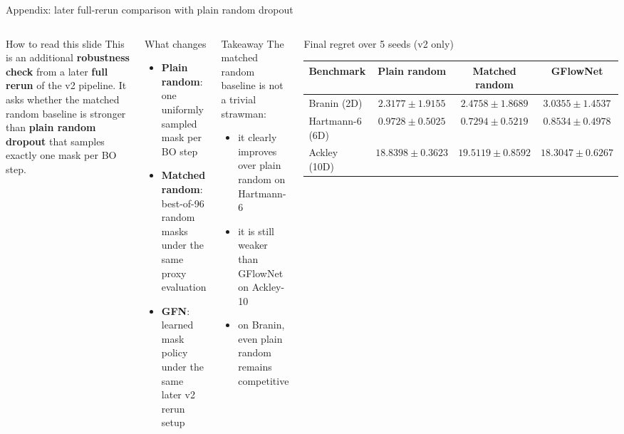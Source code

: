 \documentclass[aspectratio=169]{beamer}
\begin{document}
\appendix
\begin{frame}{Appendix: later full-rerun comparison with plain random dropout}
\vspace{-0.55em}
\begin{columns}[T,onlytextwidth]
\begin{minipage}[t][0.80\textheight]{\linewidth}\vspace{0pt}
  \begin{cardW}{How to read this slide}
  This is an additional \textbf{robustness check} from a later \textbf{full rerun} of the v2 pipeline. It asks whether the matched random baseline is stronger than \textbf{plain random dropout} that samples exactly one mask per BO step.
  \end{cardW}

  \vfill

  \begin{cardA}{What changes}
  \begin{itemize}
    \item \textbf{Plain random}: one uniformly sampled mask per BO step
    \item \textbf{Matched random}: best-of-96 random masks under the same proxy evaluation
    \item \textbf{GFN}: learned mask policy under the same later v2 rerun setup
  \end{itemize}
  \end{cardA}

  \vfill

  \begin{cardG}{Takeaway}
  The matched random baseline is not a trivial strawman:
  \begin{itemize}
    \item it clearly improves over plain random on Hartmann-6
    \item it is still weaker than GFlowNet on Ackley-10
    \item on Branin, even plain random remains competitive
  \end{itemize}
  \end{cardG}
\end{minipage}

\begin{minipage}[t][0.80\textheight]{\linewidth}\vspace{0pt}
  \begin{card}{Final regret over 5 seeds (v2 only)}
  \centering
  \scriptsize
  \begin{tabular}{lccc}
  \toprule
  Benchmark & Plain random & Matched random & GFlowNet \\
  \midrule
  Branin (2D) & $2.3177 \pm 1.9155$ & $2.4758 \pm 1.8689$ & $3.0355 \pm 1.4537$ \\
  Hartmann-6 (6D) & $0.9728 \pm 0.5025$ & $0.7294 \pm 0.5219$ & $0.8534 \pm 0.4978$ \\
  Ackley (10D) & $18.8398 \pm 0.3623$ & $19.5119 \pm 0.8592$ & $18.3047 \pm 0.6267$ \\
  \bottomrule
  \end{tabular}


\end{card}
\end{minipage}
\end{columns}
\end{frame}
\end{document}
